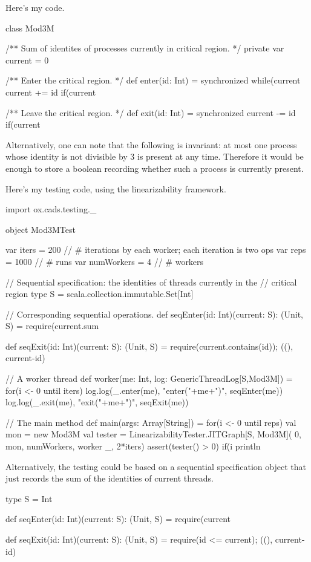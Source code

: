 \begin{answer}
Here's my code.
%
\begin{scala}
class Mod3M{
  /** Sum of identites of processes currently in critical region. */
  private var current = 0

  /** Enter the critical region. */
  def enter(id: Int) = synchronized{
    while(current%
    current += id
    if(current%
  }

  /** Leave the critical region. */
  def exit(id: Int) = synchronized{
    current -= id
    if(current%
  }
}
\end{scala}

Alternatively, one can note that the following is invariant: at most one
process whose identity is not divisible by 3 is present at any time.
Therefore it would be enough to store a boolean recording whether such a
process is currently present.

Here's my testing code, using the linearizability framework. 
%
\begin{scala}
import ox.cads.testing._

object Mod3MTest{
  var iters = 200 // # iterations by each worker; each iteration is two ops
  var reps = 1000  // # runs
  var numWorkers = 4 // # workers

  // Sequential specification: the identities of threads currently in the
  // critical region
  type S = scala.collection.immutable.Set[Int]

  // Corresponding sequential operations. 
  def seqEnter(id: Int)(current: S): (Unit, S) = {
    require(current.sum%
  }

  def seqExit(id: Int)(current: S): (Unit, S) = {
    require(current.contains(id)); ((), current-id)
  }

  // A worker thread
  def worker(me: Int, log: GenericThreadLog[S,Mod3M]) = {
    for(i <- 0 until iters){
      log.log(_.enter(me), "enter("+me+")", seqEnter(me))
      log.log(_.exit(me), "exit("+me+")", seqExit(me))
    }
  }

  // The main method
  def main(args: Array[String]) = {
    for(i <- 0 until reps){
      val mon = new Mod3M
      val tester = LinearizabilityTester.JITGraph[S, Mod3M](
        0, mon, numWorkers, worker _, 2*iters)
      assert(tester() > 0)
      if(i%
    }
    println
  }
}
\end{scala}

Alternatively, the testing could be based on a sequential specification object
that just records the sum of the identities of current threads.
%
\begin{scala}
  type S = Int

  def seqEnter(id: Int)(current: S): (Unit, S) = {
    require(current%
  }

  def seqExit(id: Int)(current: S): (Unit, S) = {
    require(id <= current); ((), current-id)
  }
\end{scala}
\end{answer}
